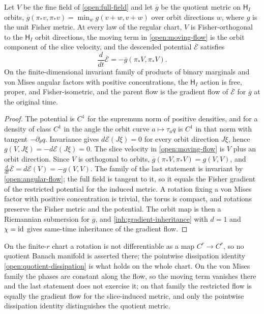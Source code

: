 Let $V$ be the fine field of \cref{open:full-field} and let $\overline g$ be the quotient metric on $\mathsf H_I$ orbits, $\overline g(\pi_*v,\pi_*v)=\min_w g(v+w,v+w)$ over orbit directions $w$, where $g$ is the unit Fisher metric. At every law of the regular chart, $V$ is Fisher-orthogonal to the $\mathsf H_I$ orbit directions, the moving term in \cref{open:moving-flow} is the orbit component of the slice velocity, and the descended potential $\overline{\mathcal E}$ satisfies
\begin{equation}
\frac{d}{dt}\overline{\mathcal E}=-\overline g(\pi_*V,\pi_*V).
\label{open:quotient-dissipation}
\end{equation}
On the finite-dimensional invariant family of products of binary marginals and von Mises angular factors with positive concentrations, the $\mathsf H_I$ action is free, proper, and Fisher-isometric, and the parent flow is the gradient flow of $\overline{\mathcal E}$ for $\overline g$ at the original time.
\begin{proof}
The potential is $C^1$ for the supremum norm of positive densities, and for a density of class $C^1$ in the angle the orbit curve $a\mapsto\tau_aq$ is $C^1$ in that norm with tangent $-\partial_\theta q$. Invariance gives $d\mathcal E(J\xi)=0$ for every orbit direction $J\xi$, hence $g(V,J\xi)=-d\mathcal E(J\xi)=0$. The slice velocity in \cref{open:moving-flow} is $V$ plus an orbit direction. Since $V$ is orthogonal to orbits, $\overline g(\pi_*V,\pi_*V)=g(V,V)$, and $\frac{d}{dt}\overline{\mathcal E}=d\mathcal E(V)=-g(V,V)$. The family of the last statement is invariant by \cref{open:angular-flow}; the full field is tangent to it, so it equals the Fisher gradient of the restricted potential for the induced metric. A rotation fixing a von Mises factor with positive concentration is trivial, the torus is compact, and rotations preserve the Fisher metric and the potential. The orbit map is then a Riemannian submersion for $\overline g$, and \cref{inh:gradient-inheritance} with $d=1$ and $\chi=\mathrm{id}$ gives same-time inheritance of the gradient flow.
\end{proof}

On the finite-$r$ chart a rotation is not differentiable as a map $C^r\to C^r$, so no quotient Banach manifold is asserted there; the pointwise dissipation identity \cref{open:quotient-dissipation} is what holds on the whole chart. On the von Mises family the phases are constant along the flow, so the moving term vanishes there and the last statement does not exercise it; on that family the restricted flow is equally the gradient flow for the slice-induced metric, and only the pointwise dissipation identity distinguishes the quotient metric.


